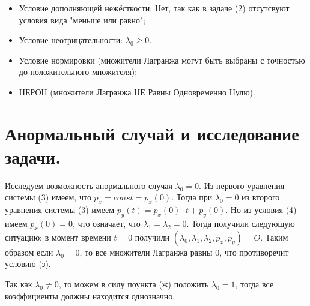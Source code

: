 \documentclass[a4paper,12pt]{article}
\begin{document}
\begin{itemize}
\item[\text{(д)}]
Условие дополняющей нежёсткости:\newline
Нет, так как в задаче (2) отсутсвуют условия вида "меньше или равно"; 

\item[\text{(e)}]
Условие неотрицательности: $\lambda_0 \geq 0.$

\item[\text{(ж)}]
Условие нормировки (множители Лагранжа могут быть выбраны с точностью до положительного множителя);

\item[\text{(з)}]
НЕРОН (множители Лагранжа НЕ Равны Одновременно Нулю).
\end{itemize}





\section{Анормальный случай и исследование задачи.}
Исследуем возможность анормального случая $\lambda_0=0$. Из первого уравнения системы (3) имеем, что $p_x=const=p_x(0).$ Тогда при $\lambda_0=0$ из второго уравнения системы (3) имеем $p_y(t)=p_x(0) \cdot t + p_y(0)$. Но из условия (4) имеем $p_x(0)=0$, что означает, что $\lambda_1=\lambda_2=0$. Тогда получили следующую ситуацию:\newline
в момент времени $t=0$ получили $(\lambda_0,\lambda_1,\lambda_2,p_x,p_y)=O$.
Таким образом если $\lambda_0=0$, то все множители Лагранжа равны 0, что противоречит условию (з).

Так как $\lambda_0 \neq 0$, то можем в силу поункта (ж) положить $\lambda_0=1$, тогда все коэффициенты должны находится однозначно.
\end{document}
